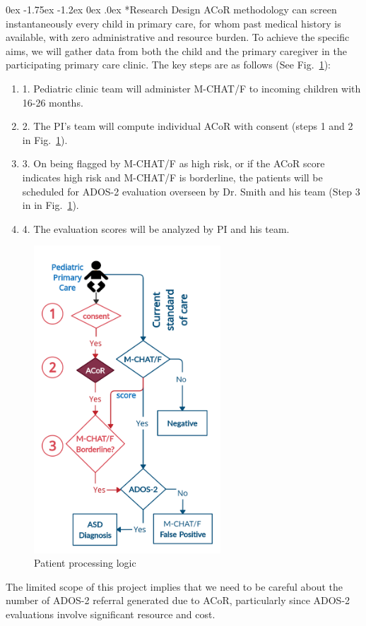 \documentclass[onecolumn, compsoc,11pt]{IEEEtran}
\makeatletter
\renewcommand\subsection{\@startsection {subsection}{2}{\z@}%
                                   {0ex \@plus -1.75ex \@minus -1.2ex}%
                                   {0ex \@plus.0ex}%
                                   {\fontsize{11}{11}\selectfont\bfseries\sffamily\color{black}}}
\def\ZERO{ACoR\xspace}
\def\acor{ACoR\xspace}
\makeatother
\begin{document}
\subsection*{Research Design}
\ZERO methodology can  screen instantaneously   every child  in primary care, for whom past medical history is available, with zero administrative and resource burden. To achieve the specific  aims, we will gather data from both the child and the primary caregiver in the participating  primary care clinic. The key steps are as  follows (See Fig.~\ref{figflow}):
\begin{enumerate} 
[label=$\square$, leftmargin=0pt,
labelindent=0em, topsep=0.1em, labelsep=*, itemsep=.5em,itemindent=1em]
 \item 1. Pediatric clinic team  will  administer  M-CHAT/F to incoming children with 16-26 months.
\item 2. The PI's team will
  compute  individual \acor  with consent (steps 1 and 2 in Fig.~\ref{figflow}).
\item 3. On being flagged by M-CHAT/F  as high risk, or if the \ZERO score indicates high risk and  M-CHAT/F is borderline,  the patients will be scheduled for ADOS-2 evaluation overseen by Dr. Smith and his team (Step 3 in in Fig.~\ref{figflow}).
\item 4. The evaluation scores will be analyzed by  PI and his  team.
\end{enumerate}

\begin{figure}
  \vspace{-30pt}
  
  \hspace{-10pt}\includegraphics[width=2.75in]{Figures/flow1}
  \vspace{-15pt}
  
  \caption{Patient processing logic }\label{figflow}
\end{figure}
The limited scope of this project implies that we need to be careful about the number of ADOS-2 referral generated due to \ZERO, particularly since ADOS-2 evaluations involve significant resource and cost.
\end{document}
